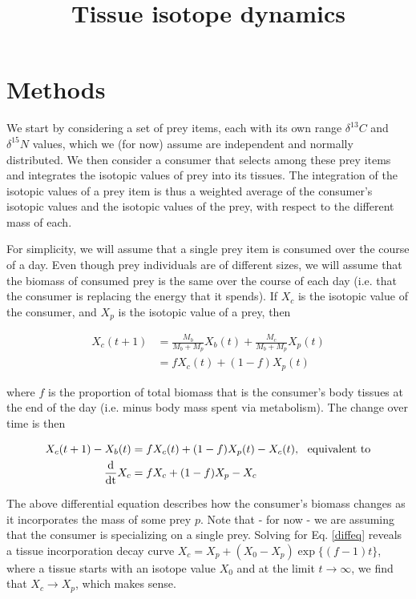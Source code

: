 \documentclass[11pt]{article}
\begin{document}
\title{Tissue isotope dynamics}

\maketitle

\section{Methods}
We start by considering a set of prey items, each with its own range $\delta^{13}C$ and $\delta^{15}N$ values, which we (for now) assume are independent and normally distributed.
We then consider a consumer that selects among these prey items and integrates the isotopic values of prey into its tissues.
The integration of the isotopic values of a prey item is thus a weighted average of the consumer's isotopic values and the isotopic values of the prey, with respect to the different mass of each.

For simplicity, we will assume that a single prey item is consumed over the course of a day.
Even though prey individuals are of different sizes, we will assume that the biomass of consumed prey is the same over the course of each day (i.e. that the consumer is replacing the energy that it spends). 
If $X_c$ is the isotopic value of the consumer, and $X_p$ is the isotopic value of a prey, then

\begin{align}
	X_c(t+1) &= \frac{M_b}{M_b + M_p}X_b(t) + \frac{M_c}{M_b + M_p}X_p(t) \\ \nonumber
	&= fX_c(t) + (1-f)X_p(t)
\end{align}

\noindent where $f$ is the proportion of total biomass that is the consumer's body tissues at the end of the day (i.e. minus body mass spent via metabolism).
The change over time is then

\begin{align}
\label{diffeq}
	X_c(t+1) - X_b(t) &= fX_c(t) + (1-f)X_p(t) - X_c(t),~~\mbox{equivalent to} \\
	\frac{\rm d}{\rm dt}X_c &= fX_c + (1-f)X_p - X_c
\end{align}

The above differential equation describes how the consumer's biomass changes as it incorporates the mass of some prey $p$.
Note that - for now - we are assuming that the consumer is specializing on a single prey.
Solving for Eq. \ref{diffeq} reveals a tissue incorporation decay curve $X_c = X_p + (X_0-X_p)\exp\{(f-1)t\}$, where a tissue starts with an isotope value $X_0$ and at the limit $t\rightarrow \infty $, we find that $X_c \rightarrow X_p$, which makes sense.
\end{document}
